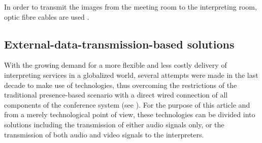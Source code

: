 \documentclass[output=paper]{langsci/langscibook}
\begin{document}
In order to transmit the images from the meeting room to the interpreting room, optic fibre cables are used \citep{Technical2016}. 

\subsection{External-data-transmission-based solutions} 
\label{sub:ziegler:4.2}
With the growing demand for a more flexible and less costly delivery of interpreting services in a globalized world, several attempts were made in the last decade to make use of technologies, thus overcoming the restrictions of the traditional presence-based scenario with a direct wired connection of all components of the conference system (see ). For the purpose of this article and from a merely technological point of view, these technologies can be divided into solutions including the transmission of either audio signals only, or the transmission of both audio and video signals to the interpreters. 
\end{document}
